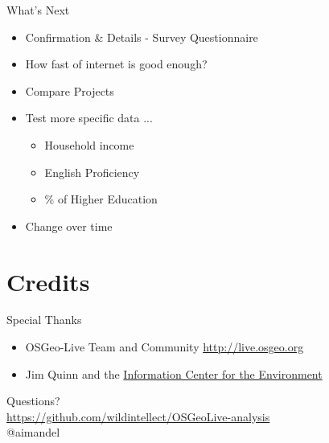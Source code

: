 \documentclass{beamer}
\begin{document}
\begin{frame}{What's Next}
	\begin{itemize}
			\item Confirmation \& Details - Survey Questionnaire
			\item How fast of internet is good enough?
			\item Compare Projects
			\item Test more specific data ...
			\begin{itemize}
				\item Household income
				\item English Proficiency
				\item \% of Higher Education
			\end{itemize}			 
			\item Change over time

	\end{itemize}
\end{frame}


\section{Credits}
\begin{frame}{Special Thanks}
	\begin{itemize}
		\item OSGeo-Live Team and Community \url{http://live.osgeo.org}
		\item Jim Quinn and the \href{http://ice.ucdavis.edu}{Information Center for the Environment}
	\end{itemize}
			\begin{center}
			Questions?\\
			\url{https://github.com/wildintellect/OSGeoLive-analysis}\\
			@aimandel
		\end{center}
	

\end{frame}


\end{document}
